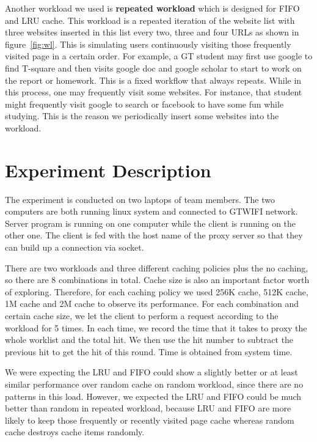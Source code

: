 \documentclass[paper=a4, fontsize=11pt]{scrartcl} %
\numberwithin{equation}{section} %
\numberwithin{figure}{section} %
\numberwithin{table}{section} %
\begin{document}
Another workload we used is \textbf{repeated workload} which is designed for FIFO and LRU cache. This workload is a repeated iteration of the website list with three websites inserted in this list every two, three and four URLs as shown in figure~\ref{fig:wl}. This is simulating users continuously visiting those frequently visited page in a certain order. For example, a GT student may first use google to find T-square and then visits google doc and google scholar to start to work on the report or homework. This is a fixed workflow that always repeats. While in this process, one may frequently visit some websites. For instance, that student might frequently visit google to search or facebook to have some fun while studying. This is the reason we periodically insert some websites into the workload.  
    


\section{Experiment Description}

The experiment is conducted on two laptops of team members. The two computers are both running linux system and connected to GTWIFI network. Server program is running on one computer while the client is running on the other one. The client is fed with the host name of the proxy server so that they can build up a connection via socket. 

\vspace{1em}

There are two workloads and three different caching policies plus the no caching, so there are 8 combinations in total. Cache size is also an important factor worth of exploring. Therefore, for each caching policy we used 256K cache, 512K cache, 1M cache and 2M cache to observe its 
performance. For each combination and certain cache size, we let the client to perform a request according to the workload for 5 times. In each time, we record the time that it takes to proxy the whole worklist and the total hit. We then use the hit number to subtract the previous hit to get the hit of this round. Time is obtained from system time. 

\vspace{1em}

We were expecting the LRU and FIFO could show a slightly better or at least similar performance over random cache on random workload, since there are no patterns in this load. However, we expected the LRU and FIFO could be much better than random in repeated workload, because LRU and FIFO are more likely to keep those frequently or recently visited page cache whereas random cache destroys cache items randomly. 
\end{document}
